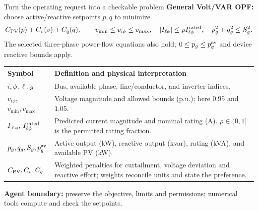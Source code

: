 \begin{frame}[t]{Turn the operating request into a checkable problem}
\small
\textbf{General Volt/VAR OPF:} choose active/reactive setpoints $p,q$ to minimize
\[
 C_{\rm PV}(p)+C_v(v)+C_q(q),\qquad
 v_{\min}\leq v_{i\phi}\leq v_{\max},\quad
 |I_{\ell\phi}|\leq\rho I^{\rm rated}_{\ell\phi},\quad
 p_g^2+q_g^2\leq S_g^2 .
\]
The selected three-phase power-flow equations also hold; $0\leq p_g\leq p_g^{\rm av}$ and device reactive bounds apply.
\footnotesize
\begin{tabular}{@{}p{.24\linewidth}p{.68\linewidth}@{}}
\toprule Symbol & Definition and physical interpretation \\
\midrule
$i,\phi,\ell,g$ & Bus, available phase, line/conductor, and inverter indices. \\
$v_{i\phi}$, $v_{\min},v_{\max}$ & Voltage magnitude and allowed bounds (p.u.); here $0.95$ and $1.05$. \\
$I_{\ell\phi}$, $I^{\rm rated}_{\ell\phi}$ & Predicted current magnitude and nominal rating (A). $\rho\in(0,1]$ is the permitted rating fraction. \\
$p_g,q_g,S_g,p_g^{\rm av}$ & Active output (kW), reactive output (kvar), rating (kVA), and available PV (kW). \\
$C_{\rm PV},C_v,C_q$ & Weighted penalties for curtailment, voltage deviation and reactive effort; weights reconcile units and state the preference. \\
\bottomrule
\end{tabular}
\smallskip\par\small\textbf{Agent boundary:} preserve the objective, limits and permissions; numerical tools compute and check the setpoints.
\end{frame}

